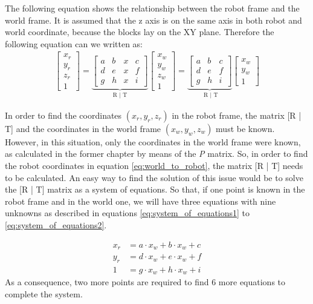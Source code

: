 The following equation shows the relationship between the robot frame and the world frame. It is assumed that the z axis is on the same axis in both robot and world coordinate, because the blocks lay on the XY plane. Therefore the following equation can we written as: 
\begin{align*}
\begin{bmatrix}
x_r \\
y_r \\
z_r \\
1 
\end{bmatrix}
= \underbrace{\begin{bmatrix}
a & b & x & c \\
d & e & x & f \\
g & h & x & i 
\end{bmatrix}}_{\text{R | T}}
\begin{bmatrix}
x_w \\
y_w \\
z_w\\
1 
\end{bmatrix}
= \underbrace{\begin{bmatrix}
a & b & c \\
d & e & f \\
g & h & i 
\end{bmatrix}}_{\text{    R   | T}}
\begin{bmatrix}
x_w \\
y_w \\
1 
\end{bmatrix}
\label{eq:world_to_robot}
\end{align*}


In order to find the coordinates $(x_r,y_r,z_r)$ in the robot frame, the matrix [R | T] and the coordinates in the world frame $(x_w,y_w,z_w)$ must be known. However, in this situation, only  the coordinates in the world frame were known, as calculated in the former chapter by means of the \textit{P} matrix. So, in order to find the robot coordinates in equation \ref{eq:world_to_robot}, the matrix [R | T] needs to be calculated. An easy way to find the solution of this issue would be to solve the [R | T] matrix as a system of equations. So that, if one point is known in the robot frame and in the world one, we will have three equations with nine unknowns as described in equations \ref{eq:system_of_equations1} to \ref{eq:system_of_equations2}.
 
\begin{align}
\label{eq:system_of_equations1}
x_r &= a\cdot x_w + b\cdot x_w + c \\
y_r &= d\cdot x_w + e\cdot x_w + f \\
1 &= g\cdot x_w + h\cdot x_w + i
\label{eq:system_of_equations2}
\end{align}
As a consequence, two more points are required to find 6 more equations to complete the system. 

